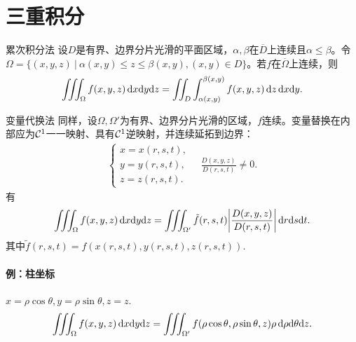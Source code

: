 \section{三重积分}
\begin{theorem}
	{累次积分法}{}
	设$D$是有界、边界分片光滑的平面区域，$\alpha,\beta$在$\overline D$上连续且$\alpha \leq \beta$。令$\Omega = \{(x,y,z)~|~\alpha(x,y) \leq z \leq \beta(x,y),(x,y) \in D\}$。若$f$在$\overline\Omega$上连续，则
	\begin{equation}\label{eq:calc-iterated-triple-integral}
		\iiint_\Omega f(x,y,z)\mathop{}\!\mathrm{d} x\mathrm{d} y\mathrm{d} z = \iint_D\int_{\alpha(x,y)}^{\beta(x,y)}f(x,y,z)\mathop{}\!\mathrm{d} z\mathop{}\!\mathrm{d} x\mathrm{d} y.
	\end{equation}
\end{theorem}
\begin{theorem}
	{变量代换法}{}
	同样，设$\Omega,\Omega'$为有界、边界分片光滑的区域，$f$连续。变量替换在内部应为$\mathcal{C}^1$一一映射、具有$\mathcal{C}^1$逆映射，并连续延拓到边界：
	\begin{align*}
		\begin{cases}
			x = x(r,s,t), \\
			y = y(r,s,t), \\
			z = z(r,s,t).
		\end{cases}
		\quad\frac{D(x,y,z)}{D(r,s,t)} \neq 0.
	\end{align*}
	有
	\begin{equation}\label{eq:calc-spatial-substitution}
		\iiint_\Omega f(x,y,z)\mathop{}\!\mathrm{d} x\mathrm{d} y\mathrm{d} z = \iiint_{\Omega'}\tilde f(r,s,t)\biggl\lvert\frac{D(x,y,z)}{D(r,s,t)}\biggr\rvert\mathop{}\!\mathrm{d} r\mathrm{d} s\mathrm{d} t.
	\end{equation}
	其中$\tilde f(r,s,t) = f(x(r,s,t),y(r,s,t),z(r,s,t)).$
\end{theorem}
\paragraph{例：柱坐标}$x = \rho\cos\theta,y = \rho\sin\theta,z = z.$
\begin{equation}\label{eq:calc-cylindrical-integral}
	\iiint_\Omega f(x,y,z)\mathop{}\!\mathrm{d} x\mathrm{d} y\mathrm{d} z = \iiint_{\Omega'}f(\rho\cos\theta,\rho\sin\theta,z)\rho\mathop{}\!\mathrm{d}\rho\mathrm{d}\theta\mathrm{d} z.
\end{equation}
